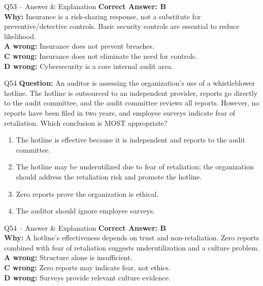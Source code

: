 \documentclass[aspectratio=169,10pt]{beamer}
\begin{document}
	\begin{frame}[t]{Q53 -- Answer \& Explanation}
		\small
		\textbf{Correct Answer: B} \\[4pt]
		\textbf{Why:} Insurance is a risk-sharing response, not a substitute for preventive/detective controls. Basic security controls are essential to reduce likelihood. \\[4pt]
		\textbf{A wrong:} Insurance does not prevent breaches. \\[2pt]
		\textbf{C wrong:} Insurance does not eliminate the need for controls. \\[2pt]
		\textbf{D wrong:} Cybersecurity is a core internal audit area.
	\end{frame}
	
	\begin{frame}[t]{Q54}
		\small
		\textbf{Question:} An auditor is assessing the organization's use of a whistleblower hotline. The hotline is outsourced to an independent provider, reports go directly to the audit committee, and the audit committee reviews all reports. However, no reports have been filed in two years, and employee surveys indicate fear of retaliation. Which conclusion is MOST appropriate?
		\begin{enumerate}[label=\Alph*.,itemsep=1pt,topsep=2pt]
			\item The hotline is effective because it is independent and reports to the audit committee.
			\item The hotline may be underutilized due to fear of retaliation; the organization should address the retaliation risk and promote the hotline.
			\item Zero reports prove the organization is ethical.
			\item The auditor should ignore employee surveys.
		\end{enumerate}
	\end{frame}
	
	\begin{frame}[t]{Q54 -- Answer \& Explanation}
		\small
		\textbf{Correct Answer: B} \\[4pt]
		\textbf{Why:} A hotline's effectiveness depends on trust and non-retaliation. Zero reports combined with fear of retaliation suggests underutilization and a culture problem. \\[4pt]
		\textbf{A wrong:} Structure alone is insufficient. \\[2pt]
		\textbf{C wrong:} Zero reports may indicate fear, not ethics. \\[2pt]
		\textbf{D wrong:} Surveys provide relevant culture evidence.
	\end{frame}
	
\end{document}
